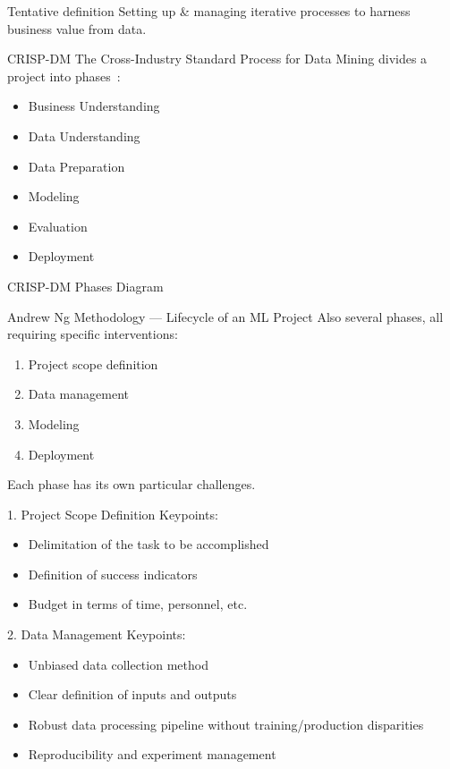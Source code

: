 \begin{frame}{Tentative definition}
  Setting up \& managing iterative processes to harness business value from data.
\end{frame}

\begin{frame}{CRISP-DM}
  The Cross-Industry Standard Process for Data Mining divides a project into phases~:

  \begin{itemize}
    \item Business Understanding
    \item Data Understanding
    \item Data Preparation
    \item Modeling
    \item Evaluation
    \item Deployment
  \end{itemize}
\end{frame}

\begin{frame}{CRISP-DM Phases Diagram}
\end{frame}

\begin{frame}{Andrew Ng Methodology — Lifecycle of an ML Project}
  Also several phases, all requiring specific interventions:
  \begin{enumerate}
    \item Project scope definition
    \item Data management
    \item Modeling
    \item Deployment
  \end{enumerate}
  Each phase has its own particular challenges.
\end{frame}

\begin{frame}{1. Project Scope Definition}
  Keypoints:
  \begin{itemize}
    \item Delimitation of the task to be accomplished
    \item Definition of success indicators
    \item Budget in terms of time, personnel, etc.
  \end{itemize}
\end{frame}

\begin{frame}{2. Data Management}
  Keypoints:
  \begin{itemize}
    \item Unbiased data collection method
    \item Clear definition of inputs and outputs
    \item Robust data processing pipeline without training/production disparities
    \item Reproducibility and experiment management
  \end{itemize}
\end{frame}

